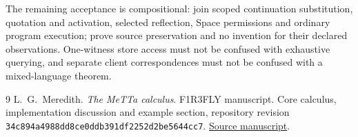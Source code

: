 \documentclass[11pt]{article}
\newcommand{\code}[1]{\texttt{\small #1}}
\begin{document}
The remaining acceptance is compositional: join scoped continuation
substitution, quotation and activation, selected reflection, Space
permissions and ordinary program execution; prove source preservation
and no invention for their declared observations. One-witness store access
must not be confused with exhaustive querying, and separate client
correspondences must not be confused with a mixed-language theorem.

\begin{thebibliography}{9}
L.~G.~Meredith.
\emph{The MeTTa calculus}. F1R3FLY manuscript.
Core calculus, implementation discussion and example section, repository
revision \code{34c894a4988dd8ce0ddb391df2252d2be5644cc7}.
\href{https://github.com/leithaus/rho4u/tree/34c894a4988dd8ce0ddb391df2252d2be5644cc7/metta-calculus}{Source manuscript}.
\end{thebibliography}
\end{document}
